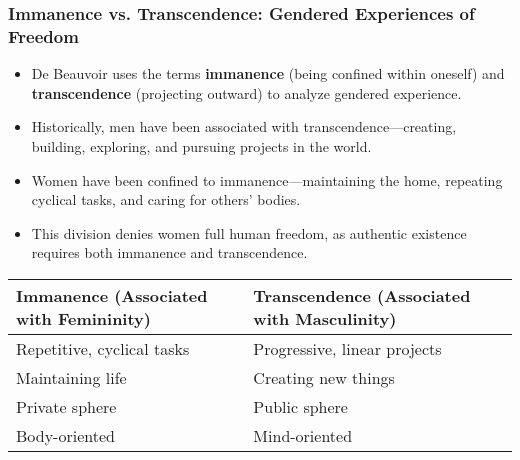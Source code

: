 \documentclass[aspectratio=169]{beamer}
\begin{document}
		\begin{frame}
			\frametitle{Immanence vs. Transcendence: Gendered Experiences of Freedom}
			\begin{itemize}
				\item De Beauvoir uses the terms \textbf{immanence} (being confined within oneself) and \textbf{transcendence} (projecting outward) to analyze gendered experience.
				\item Historically, men have been associated with transcendence—creating, building, exploring, and pursuing projects in the world.
				\item Women have been confined to immanence—maintaining the home, repeating cyclical tasks, and caring for others' bodies.
				\item This division denies women full human freedom, as authentic existence requires both immanence and transcendence.
			\end{itemize}
			
			\begin{center}
				\begin{tabular}{|p{5cm}|p{5cm}|}
					\hline
					\textbf{Immanence (Associated with Femininity)} & \textbf{Transcendence (Associated with Masculinity)} \\
					\hline
					Repetitive, cyclical tasks & Progressive, linear projects \\
					Maintaining life & Creating new things \\
					Private sphere & Public sphere \\
					Body-oriented & Mind-oriented \\
					\hline
				\end{tabular}
			\end{center}
		\end{frame}
		
\end{document}
